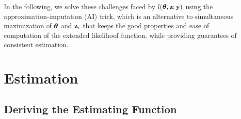 \documentclass[twoside,11pt]{article}
\begin{document}
In the following, we solve these challenges faced by $l({\bm{\theta}}, {\bf z};{\bf y})$ using the approximation-imputation (AI) trick, which is an alternative to simultaneous maximization of ${\bm{\theta}}$ and ${\bf z}_i$ that keeps the good properties and ease of computation of the extended likelihoof function, while providing guarantees of consistent estimation.

\section{Estimation}

\subsection{Deriving the Estimating Function}
\end{document}
